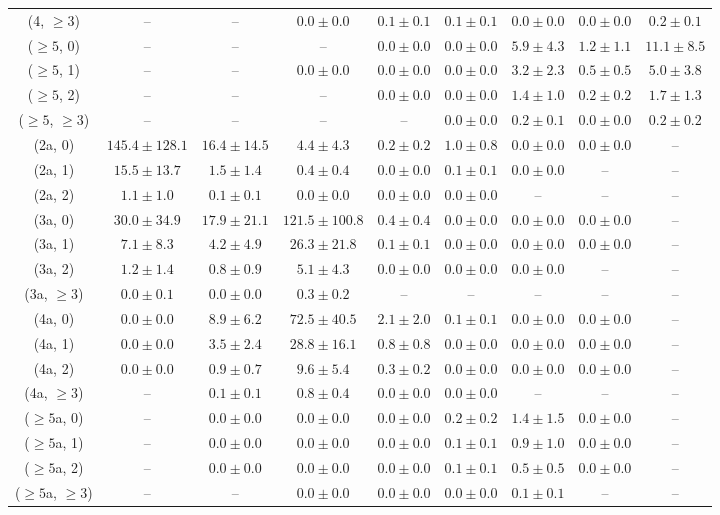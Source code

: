 \begin{table}[h!]
{\begin{tabular}{ccccccccc}
	(4, $\ge3$) & -- & -- & $0.0\pm 0.0$ & $0.1\pm 0.1$ & $0.1\pm 0.1$ & $0.0\pm 0.0$ & $0.0\pm 0.0$ & $0.2\pm 0.1$ \\[0.5ex] 
	($\ge5$, 0) & -- & -- & -- & $0.0\pm 0.0$ & $0.0\pm 0.0$ & $5.9\pm 4.3$ & $1.2\pm 1.1$ & $11.1\pm 8.5$ \\[0.5ex] 
	($\ge5$, 1) & -- & -- & $0.0\pm 0.0$ & $0.0\pm 0.0$ & $0.0\pm 0.0$ & $3.2\pm 2.3$ & $0.5\pm 0.5$ & $5.0\pm 3.8$ \\[0.5ex] 
	($\ge5$, 2) & -- & -- & -- & $0.0\pm 0.0$ & $0.0\pm 0.0$ & $1.4\pm 1.0$ & $0.2\pm 0.2$ & $1.7\pm 1.3$ \\[0.5ex] 
	($\ge5$, $\ge3$) & -- & -- & -- & -- & $0.0\pm 0.0$ & $0.2\pm 0.1$ & $0.0\pm 0.0$ & $0.2\pm 0.2$ \\[0.5ex] 
	(2a, 0) & $145.4\pm 128.1$ & $16.4\pm 14.5$ & $4.4\pm 4.3$ & $0.2\pm 0.2$ & $1.0\pm 0.8$ & $0.0\pm 0.0$ & $0.0\pm 0.0$ & -- \\[0.5ex] 
	(2a, 1) & $15.5\pm 13.7$ & $1.5\pm 1.4$ & $0.4\pm 0.4$ & $0.0\pm 0.0$ & $0.1\pm 0.1$ & $0.0\pm 0.0$ & -- & -- \\[0.5ex] 
	(2a, 2) & $1.1\pm 1.0$ & $0.1\pm 0.1$ & $0.0\pm 0.0$ & $0.0\pm 0.0$ & $0.0\pm 0.0$ & -- & -- & -- \\[0.5ex] 
	(3a, 0) & $30.0\pm 34.9$ & $17.9\pm 21.1$ & $121.5\pm 100.8$ & $0.4\pm 0.4$ & $0.0\pm 0.0$ & $0.0\pm 0.0$ & $0.0\pm 0.0$ & -- \\[0.5ex] 
	(3a, 1) & $7.1\pm 8.3$ & $4.2\pm 4.9$ & $26.3\pm 21.8$ & $0.1\pm 0.1$ & $0.0\pm 0.0$ & $0.0\pm 0.0$ & $0.0\pm 0.0$ & -- \\[0.5ex] 
	(3a, 2) & $1.2\pm 1.4$ & $0.8\pm 0.9$ & $5.1\pm 4.3$ & $0.0\pm 0.0$ & $0.0\pm 0.0$ & $0.0\pm 0.0$ & -- & -- \\[0.5ex] 
	(3a, $\ge3$) & $0.0\pm 0.1$ & $0.0\pm 0.0$ & $0.3\pm 0.2$ & -- & -- & -- & -- & -- \\[0.5ex] 
	(4a, 0) & $0.0\pm 0.0$ & $8.9\pm 6.2$ & $72.5\pm 40.5$ & $2.1\pm 2.0$ & $0.1\pm 0.1$ & $0.0\pm 0.0$ & $0.0\pm 0.0$ & -- \\[0.5ex] 
	(4a, 1) & $0.0\pm 0.0$ & $3.5\pm 2.4$ & $28.8\pm 16.1$ & $0.8\pm 0.8$ & $0.0\pm 0.0$ & $0.0\pm 0.0$ & $0.0\pm 0.0$ & -- \\[0.5ex] 
	(4a, 2) & $0.0\pm 0.0$ & $0.9\pm 0.7$ & $9.6\pm 5.4$ & $0.3\pm 0.2$ & $0.0\pm 0.0$ & $0.0\pm 0.0$ & $0.0\pm 0.0$ & -- \\[0.5ex] 
	(4a, $\ge3$) & -- & $0.1\pm 0.1$ & $0.8\pm 0.4$ & $0.0\pm 0.0$ & $0.0\pm 0.0$ & -- & -- & -- \\[0.5ex] 
	($\ge5$a, 0) & -- & $0.0\pm 0.0$ & $0.0\pm 0.0$ & $0.0\pm 0.0$ & $0.2\pm 0.2$ & $1.4\pm 1.5$ & $0.0\pm 0.0$ & -- \\[0.5ex] 
	($\ge5$a, 1) & -- & $0.0\pm 0.0$ & $0.0\pm 0.0$ & $0.0\pm 0.0$ & $0.1\pm 0.1$ & $0.9\pm 1.0$ & $0.0\pm 0.0$ & -- \\[0.5ex] 
	($\ge5$a, 2) & -- & $0.0\pm 0.0$ & $0.0\pm 0.0$ & $0.0\pm 0.0$ & $0.1\pm 0.1$ & $0.5\pm 0.5$ & $0.0\pm 0.0$ & -- \\[0.5ex] 
	($\ge5$a, $\ge3$) & -- & -- & $0.0\pm 0.0$ & $0.0\pm 0.0$ & $0.0\pm 0.0$ & $0.1\pm 0.1$ & -- & -- \\[0.5ex] 
	\hline
	\hline
\end{tabular}}
\end{table}
